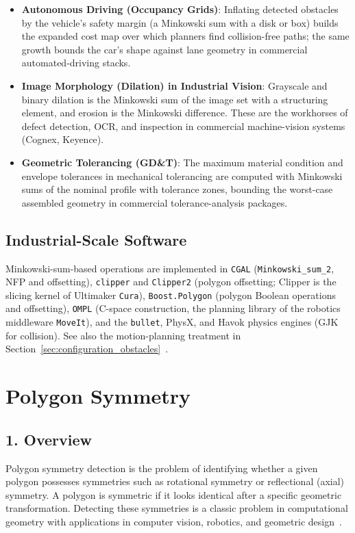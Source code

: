 \begin{itemize}
\item \textbf{Autonomous Driving (Occupancy Grids)}: Inflating detected
  obstacles by the vehicle's safety margin (a Minkowski sum with a disk or
  box) builds the expanded cost map over which planners find collision-free
  paths; the same growth bounds the car's shape against lane geometry in
  commercial automated-driving stacks.

\item \textbf{Image Morphology (Dilation) in Industrial Vision}: Grayscale
  and binary dilation is the Minkowski sum of the image set with a
  structuring element, and erosion is the Minkowski difference. These are
  the workhorses of defect detection, OCR, and inspection in commercial
  machine-vision systems (Cognex, Keyence).

\item \textbf{Geometric Tolerancing (GD\&T)}: The maximum material condition
  and envelope tolerances in mechanical tolerancing are computed with
  Minkowski sums of the nominal profile with tolerance zones, bounding the
  worst-case assembled geometry in commercial tolerance-analysis packages.
\end{itemize}

\subsection{Industrial-Scale Software}
Minkowski-sum-based operations are implemented in \texttt{CGAL}
(\texttt{Minkowski\_sum\_2}, NFP and offsetting), \texttt{clipper} and
\texttt{Clipper2} (polygon offsetting; Clipper is the slicing kernel of
Ultimaker \texttt{Cura}), \texttt{Boost.Polygon} (polygon Boolean operations
and offsetting), \texttt{OMPL} (C-space construction, the planning library of
the robotics middleware \texttt{MoveIt}), and the \texttt{bullet}, PhysX, and
Havok physics engines (GJK for collision). See also the motion-planning
treatment in
Section~\ref{sec:configuration_obstacles}~\cite{lozanoperez1983,guibas1987}.

\section{Polygon Symmetry}
\label{sec:polygon_symmetry}

\subsection{1. Overview}
Polygon symmetry detection is the problem of identifying whether a given polygon possesses symmetries such as rotational symmetry or reflectional (axial) symmetry. A polygon is symmetric if it looks identical after a specific geometric transformation. Detecting these symmetries is a classic problem in computational geometry with applications in computer vision, robotics, and geometric design~\cite{atallah1985symmetry}.

